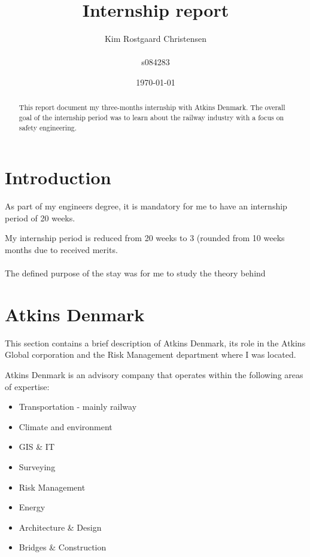 \documentclass[11pt,a4paper,UKenglish]{article}
\title{Internship report}
\author{Kim Rostgaard Christensen\\
        \\
        s084283
}
\date{\today}
\begin{document}
\maketitle  %
%

\begin{abstract}
This report document my three-months internship with Atkins Denmark. The overall goal of the internship period was to learn about the railway industry with a focus on safety engineering.
\end{abstract}

\tableofcontents
\listoffigures
\listoftables

\section*{Introduction} 
As part of my engineers degree, it is mandatory for me to have an internship period of 20 weeks.

My internship period is reduced from 20 weeks to 3 (rounded from 10 weeks months due to received merits.\\\\
The defined purpose of the stay was for me to study the theory behind 



\section{Atkins Denmark}
This section contains a brief description of Atkins Denmark, its role in the Atkins Global corporation and the Risk Management department where I was located.


Atkins Denmark is an advisory company that operates within the following areas of expertise:

\begin{itemize}
  \item Transportation - mainly railway
  \item Climate and environment
  \item GIS \& IT
  \item Surveying
  \item Risk Management
  \item Energy
  \item Architecture \& Design
  \item Bridges \& Construction
\end{itemize}
\end{document}
